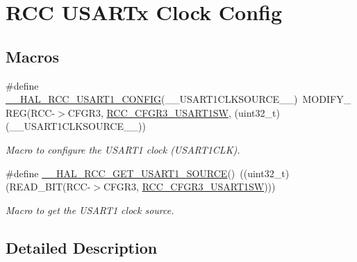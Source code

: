 \hypertarget{group___r_c_c___u_s_a_r_tx___clock___config}{}\section{R\+CC U\+S\+A\+R\+Tx Clock Config}
\label{group___r_c_c___u_s_a_r_tx___clock___config}
\subsection*{Macros}
\begin{DoxyCompactItemize}
\item 
\#define \hyperlink{group___r_c_c___u_s_a_r_tx___clock___config_gad24b5e0af45000967f8fc72f2d1ee8b4}{\+\_\+\+\_\+\+H\+A\+L\+\_\+\+R\+C\+C\+\_\+\+U\+S\+A\+R\+T1\+\_\+\+C\+O\+N\+F\+IG}(\+\_\+\+\_\+\+U\+S\+A\+R\+T1\+C\+L\+K\+S\+O\+U\+R\+C\+E\+\_\+\+\_\+)~M\+O\+D\+I\+F\+Y\+\_\+\+R\+EG(R\+CC-\/$>$C\+F\+G\+R3, \hyperlink{group___peripheral___registers___bits___definition_gab7ecf61cefe76571a3492ec9f9df6407}{R\+C\+C\+\_\+\+C\+F\+G\+R3\+\_\+\+U\+S\+A\+R\+T1\+SW}, (uint32\+\_\+t)(\+\_\+\+\_\+\+U\+S\+A\+R\+T1\+C\+L\+K\+S\+O\+U\+R\+C\+E\+\_\+\+\_\+))
\begin{DoxyCompactList}\small\item\em Macro to configure the U\+S\+A\+R\+T1 clock (U\+S\+A\+R\+T1\+C\+LK). \end{DoxyCompactList}\item 
\#define \hyperlink{group___r_c_c___u_s_a_r_tx___clock___config_gaf6ff545446befd6af48cd5108e8fbc2e}{\+\_\+\+\_\+\+H\+A\+L\+\_\+\+R\+C\+C\+\_\+\+G\+E\+T\+\_\+\+U\+S\+A\+R\+T1\+\_\+\+S\+O\+U\+R\+CE}()~((uint32\+\_\+t)(R\+E\+A\+D\+\_\+\+B\+IT(R\+CC-\/$>$C\+F\+G\+R3, \hyperlink{group___peripheral___registers___bits___definition_gab7ecf61cefe76571a3492ec9f9df6407}{R\+C\+C\+\_\+\+C\+F\+G\+R3\+\_\+\+U\+S\+A\+R\+T1\+SW})))
\begin{DoxyCompactList}\small\item\em Macro to get the U\+S\+A\+R\+T1 clock source. \end{DoxyCompactList}\end{DoxyCompactItemize}


\subsection{Detailed Description}


